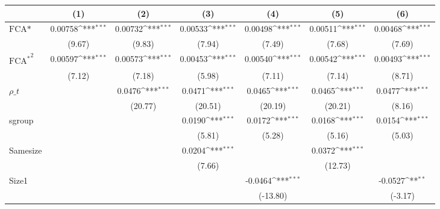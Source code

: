 {
\def\sym#1{\ifmmode^{#1}\else\(^{#1}\)\fi}
\begin{tabular}{l*{6}{c}}
\hline\hline
                    &\multicolumn{1}{c}{(1)}         &\multicolumn{1}{c}{(2)}         &\multicolumn{1}{c}{(3)}         &\multicolumn{1}{c}{(4)}         &\multicolumn{1}{c}{(5)}         &\multicolumn{1}{c}{(6)}         \\
\hline
$ \text{FCA*} $     &     0.00758\sym{***}&     0.00732\sym{***}&     0.00533\sym{***}&     0.00498\sym{***}&     0.00511\sym{***}&     0.00468\sym{***}\\
                    &      (9.67)         &      (9.83)         &      (7.94)         &      (7.49)         &      (7.68)         &      (7.69)         \\
[1em]
$ { \text{FCA}^ * } ^ 2$&     0.00597\sym{***}&     0.00573\sym{***}&     0.00453\sym{***}&     0.00540\sym{***}&     0.00542\sym{***}&     0.00493\sym{***}\\
                    &      (7.12)         &      (7.18)         &      (5.98)         &      (7.11)         &      (7.14)         &      (8.71)         \\
[1em]
 $ \rho\_t $         &                     &      0.0476\sym{***}&      0.0471\sym{***}&      0.0465\sym{***}&      0.0465\sym{***}&      0.0477\sym{***}\\
                    &                     &     (20.77)         &     (20.51)         &     (20.19)         &     (20.21)         &      (8.16)         \\
[1em]
sgroup              &                     &                     &      0.0190\sym{***}&      0.0172\sym{***}&      0.0168\sym{***}&      0.0154\sym{***}\\
                    &                     &                     &      (5.81)         &      (5.28)         &      (5.16)         &      (5.03)         \\
[1em]
Samesize            &                     &                     &      0.0204\sym{***}&                     &      0.0372\sym{***}&                     \\
                    &                     &                     &      (7.66)         &                     &     (12.73)         &                     \\
[1em]
Size1               &                     &                     &                     &     -0.0464\sym{***}&                     &     -0.0527\sym{**} \\
                    &                     &                     &                     &    (-13.80)         &                     &     (-3.17)         \\

\end{tabular}}
